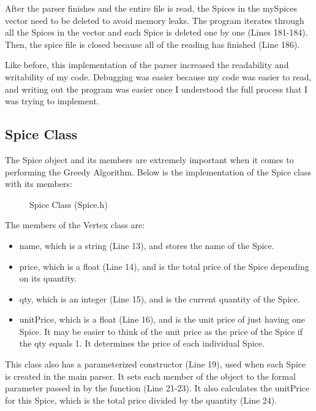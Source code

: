 \documentclass[letterpaper, 10pt]{article}
\begin{document}
\noindent
After the parser finishes and the entire file is read, the Spices in the mySpices vector need to be deleted to avoid memory leaks. The program iterates through all the Spices in the vector and each Spice is deleted one by one (Lines 181-184). Then, the spice file is closed because all of the reading has finished (Line 186).

\vspace{1em}
\noindent
Like before, this implementation of the parser increased the readability and writability of my code. Debugging was easier because my code was easier to read, and writing out the program was easier once I understood the full process that I was trying to implement. 

\subsection{Spice Class}
\noindent
The Spice object and its members are extremely important when it comes to performing the Greedy Algorithm. Below is the implementation of the Spice class with its members: 

\begin{figure}[H]
  \centering
   
  \caption{Spice Class (Spice.h)}
  \label{fig:figure3.3}
\end{figure}

\noindent
The members of the Vertex class are:
\begin{itemize}
    \item name, which is a string (Line 13), and stores the name of the Spice.
    \item price, which is a float (Line 14), and is the total price of the Spice depending on its quantity.
    \item qty, which is an integer (Line 15), and is the current quantity of the Spice.
    \item unitPrice, which is a float (Line 16), and is the unit price of just having one Spice. It may be easier to think of the unit price as the price of the Spice if the qty equals 1. It determines the price of each individual Spice.
\end{itemize}

\noindent
This class also has a parameterized constructor (Line 19), used when each Spice is created in the main parser. It sets each member of the object to the formal parameter passed in by the function (Line 21-23). It also calculates the unitPrice for this Spice, which is the total price divided by the quantity (Line 24).
\end{document}
